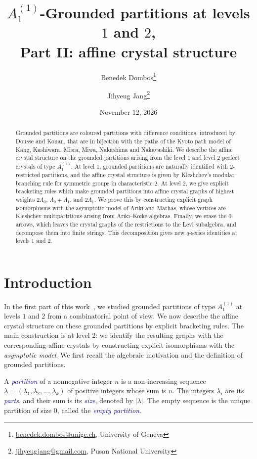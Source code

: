 \documentclass[11pt]{article}
\title{$A_1^{(1)}$-Grounded partitions at levels $1$ and $2$,\\ Part II: affine crystal structure}
\author{Benedek Dombos\thanks{\href{mailto:benedek.dombos@unige.ch}{benedek.dombos@unige.ch}, University of Geneva} \and Jihyeug Jang\thanks{\href{mailto:jihyeugjang@gmail.com}{jihyeugjang@gmail.com}, Pusan National University}}
\date{November 12, 2026}
\theoremstyle{definition}
\theoremstyle{remark}
\theoremstyle{definition}
\numberwithin{equation}{section}
\renewcommand\emph[1]{\textcolor{darkblue}{\it #1}}
\begin{document}
\maketitle

\let\oldclearpage\clearpage
\renewcommand{\clearpage}{}

\begin{abstract}
Grounded partitions are coloured partitions with difference conditions, introduced by Dousse and Konan, that are in bijection with the paths of the Kyoto path model of Kang, Kashiwara, Misra, Miwa, Nakashima and Nakayashiki. We describe the affine crystal structure on the grounded partitions arising from the level \(1\) and level \(2\) perfect crystals of type \(A_1^{(1)}\). At level \(1\), grounded partitions are naturally identified with \(2\)-restricted partitions, and the affine crystal structure is given by Kleshchev's modular branching rule for symmetric groups in characteristic \(2\). At level \(2\), we give explicit bracketing rules which make grounded partitions into affine crystal graphs of highest weights \(2\Lambda_0\), \(\Lambda_0+\Lambda_1\), and \(2\Lambda_1\). We prove this by constructing explicit graph isomorphisms with the asymptotic model of Ariki and Mathas, whose vertices are Kleshchev multipartitions arising from Ariki--Koike algebras. Finally, we erase the \(0\)-arrows, which leaves the crystal graphs of the restrictions to the Levi subalgebra, and decompose them into finite strings. This decomposition gives new \(q\)-series identities at levels \(1\) and \(2\).
\end{abstract}

\section{Introduction}

In the first part of this work~\cite{DJ25}, we studied grounded partitions of type \(A_1^{(1)}\) at levels \(1\) and \(2\) from a combinatorial point of view. We now describe the affine crystal structure on these grounded partitions by explicit bracketing rules. The main construction is at level \(2\): we identify the resulting graphs with the corresponding affine crystals by constructing explicit isomorphisms with the \textit{asymptotic model}. We first recall the algebraic motivation and the definition of grounded partitions.

A \emph{partition} of a nonnegative integer \( n \) is a non-increasing sequence \(\lambda = (\lambda_1, \lambda_2, \dots, \lambda_k)\) of positive integers whose sum is \( n \). The integers \( \lambda_i \) are its \emph{parts}, and their sum is its \emph{size}, denoted by $|\lambda|$. The empty sequence is the unique partition of size $0$, called the \emph{empty partition}.
\end{document}
